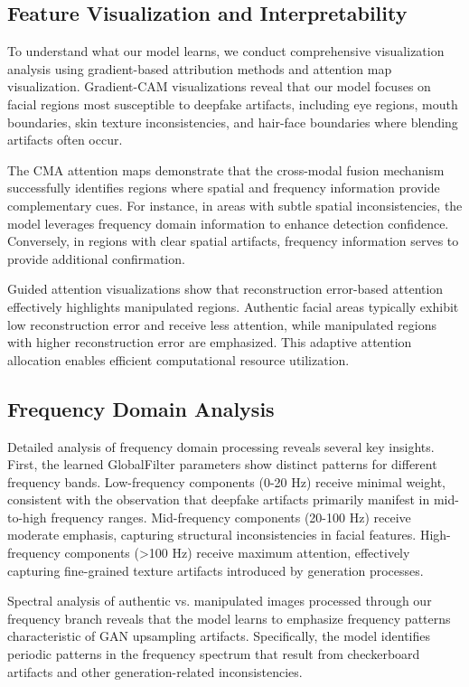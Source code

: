\documentclass[letterpaper]{article} %
\begin{document}
\subsection{Feature Visualization and Interpretability}

To understand what our model learns, we conduct comprehensive visualization analysis using gradient-based attribution methods and attention map visualization. Gradient-CAM visualizations reveal that our model focuses on facial regions most susceptible to deepfake artifacts, including eye regions, mouth boundaries, skin texture inconsistencies, and hair-face boundaries where blending artifacts often occur.

The CMA attention maps demonstrate that the cross-modal fusion mechanism successfully identifies regions where spatial and frequency information provide complementary cues. For instance, in areas with subtle spatial inconsistencies, the model leverages frequency domain information to enhance detection confidence. Conversely, in regions with clear spatial artifacts, frequency information serves to provide additional confirmation.

Guided attention visualizations show that reconstruction error-based attention effectively highlights manipulated regions. Authentic facial areas typically exhibit low reconstruction error and receive less attention, while manipulated regions with higher reconstruction error are emphasized. This adaptive attention allocation enables efficient computational resource utilization.

\subsection{Frequency Domain Analysis}

Detailed analysis of frequency domain processing reveals several key insights. First, the learned GlobalFilter parameters show distinct patterns for different frequency bands. Low-frequency components (0-20 Hz) receive minimal weight, consistent with the observation that deepfake artifacts primarily manifest in mid-to-high frequency ranges. Mid-frequency components (20-100 Hz) receive moderate emphasis, capturing structural inconsistencies in facial features. High-frequency components (>100 Hz) receive maximum attention, effectively capturing fine-grained texture artifacts introduced by generation processes.

Spectral analysis of authentic vs. manipulated images processed through our frequency branch reveals that the model learns to emphasize frequency patterns characteristic of GAN upsampling artifacts. Specifically, the model identifies periodic patterns in the frequency spectrum that result from checkerboard artifacts and other generation-related inconsistencies.
\end{document}
